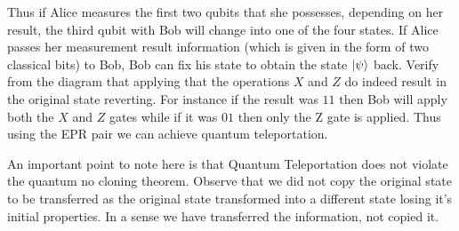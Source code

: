 Thus if Alice measures the first two qubits that she possesses, depending on her result, the third qubit with Bob will change into one of the four states. If Alice passes her measurement result information (which is given in the form of two classical bits) to Bob, Bob can fix his state to obtain the state $\ket{\psi}$ back. Verify from the diagram that applying that the operations $X$ and $Z$ do indeed result in the original state reverting. For instance if the result was $11$ then Bob will apply both the $X$ and $Z$ gates while if it was $01$ then only the Z gate is applied. Thus using the EPR pair we can achieve quantum teleportation.


An important point to note here is that Quantum Teleportation does not violate the quantum no cloning theorem. Observe that we did not copy the original state to be transferred as the original state transformed into a different state losing it's initial properties. In a sense we have transferred the information, not copied it.